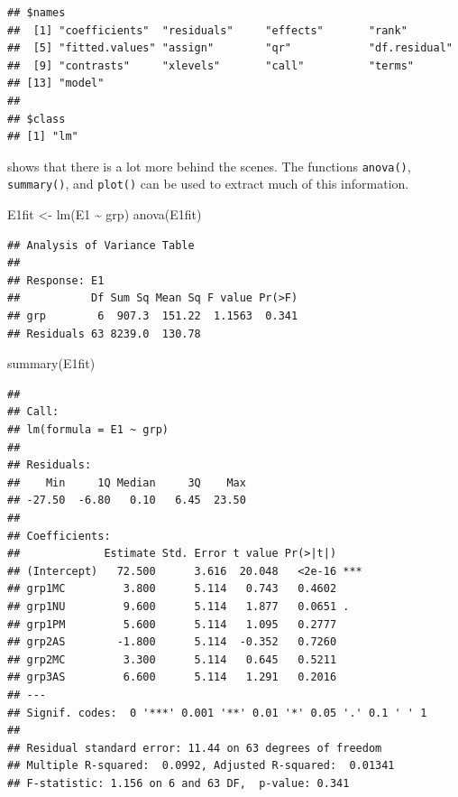 \documentclass[
]{book}
\newenvironment{Shaded}{\begin{snugshade}}{\end{snugshade}}
\newcommand{\FunctionTok}[1]{\textcolor[rgb]{0.00,0.00,0.00}{#1}}
\newcommand{\NormalTok}[1]{#1}
\newcommand{\OtherTok}[1]{\textcolor[rgb]{0.56,0.35,0.01}{#1}}
\newcommand{\SpecialCharTok}[1]{\textcolor[rgb]{0.00,0.00,0.00}{#1}}
\begin{document}
\begin{verbatim}
## $names
##  [1] "coefficients"  "residuals"     "effects"       "rank"         
##  [5] "fitted.values" "assign"        "qr"            "df.residual"  
##  [9] "contrasts"     "xlevels"       "call"          "terms"        
## [13] "model"        
## 
## $class
## [1] "lm"
\end{verbatim}

shows that there is a lot more behind the scenes. The functions \texttt{anova()}, \texttt{summary()}, and \texttt{plot()} can be used to extract much of this information.

\begin{Shaded}
\begin{Highlighting}[]
\NormalTok{E1fit }\OtherTok{\textless{}{-}} \FunctionTok{lm}\NormalTok{(E1 }\SpecialCharTok{\textasciitilde{}}\NormalTok{ grp)}
\FunctionTok{anova}\NormalTok{(E1fit)}
\end{Highlighting}
\end{Shaded}

\begin{verbatim}
## Analysis of Variance Table
## 
## Response: E1
##           Df Sum Sq Mean Sq F value Pr(>F)
## grp        6  907.3  151.22  1.1563  0.341
## Residuals 63 8239.0  130.78
\end{verbatim}

\begin{Shaded}
\begin{Highlighting}[]
\FunctionTok{summary}\NormalTok{(E1fit)}
\end{Highlighting}
\end{Shaded}

\begin{verbatim}
## 
## Call:
## lm(formula = E1 ~ grp)
## 
## Residuals:
##    Min     1Q Median     3Q    Max 
## -27.50  -6.80   0.10   6.45  23.50 
## 
## Coefficients:
##             Estimate Std. Error t value Pr(>|t|)    
## (Intercept)   72.500      3.616  20.048   <2e-16 ***
## grp1MC         3.800      5.114   0.743   0.4602    
## grp1NU         9.600      5.114   1.877   0.0651 .  
## grp1PM         5.600      5.114   1.095   0.2777    
## grp2AS        -1.800      5.114  -0.352   0.7260    
## grp2MC         3.300      5.114   0.645   0.5211    
## grp3AS         6.600      5.114   1.291   0.2016    
## ---
## Signif. codes:  0 '***' 0.001 '**' 0.01 '*' 0.05 '.' 0.1 ' ' 1
## 
## Residual standard error: 11.44 on 63 degrees of freedom
## Multiple R-squared:  0.0992, Adjusted R-squared:  0.01341 
## F-statistic: 1.156 on 6 and 63 DF,  p-value: 0.341
\end{verbatim}
\end{document}
